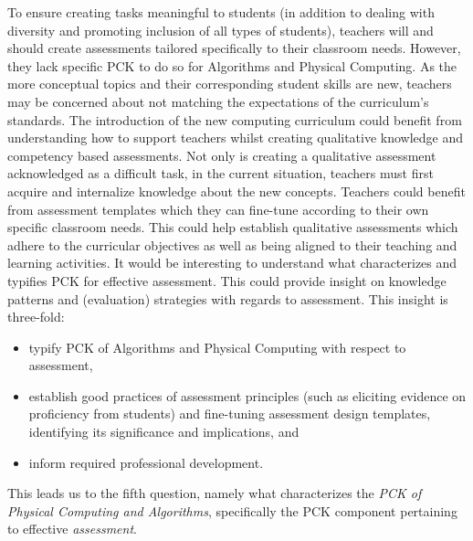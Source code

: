 To ensure creating tasks meaningful to students (in addition to dealing with diversity and promoting inclusion of all types of students), teachers will and should create assessments tailored specifically to their classroom needs. However, they lack specific PCK to do so for Algorithms and Physical Computing. As the more conceptual topics and their corresponding student skills are new, teachers may be concerned about not matching the expectations of the curriculum's standards. The introduction of the new computing curriculum could benefit from understanding how to support teachers whilst creating qualitative knowledge and competency based assessments. Not only is creating a qualitative assessment acknowledged as a difficult task, in the current situation, teachers must first acquire and internalize knowledge about the new concepts. Teachers could benefit from assessment templates which they can fine-tune according to their own specific classroom needs. This could help establish qualitative assessments which adhere to the curricular objectives as well as being aligned to their teaching and learning activities.  It would be interesting to understand what characterizes and typifies PCK for effective assessment. This could provide insight on knowledge patterns and (evaluation) strategies with regards to assessment. This insight is three-fold:
\begin{itemize}
\item typify PCK of Algorithms and Physical Computing with respect to assessment,
\item establish good practices of assessment principles (such as eliciting evidence on proficiency from students) and fine-tuning assessment design templates, identifying its significance and implications, and
\item inform required professional development.
\end{itemize}

This leads us to the fifth question, namely what characterizes the \emph{PCK of Physical Computing and Algorithms}, specifically the PCK component pertaining to effective \emph{assessment}.






